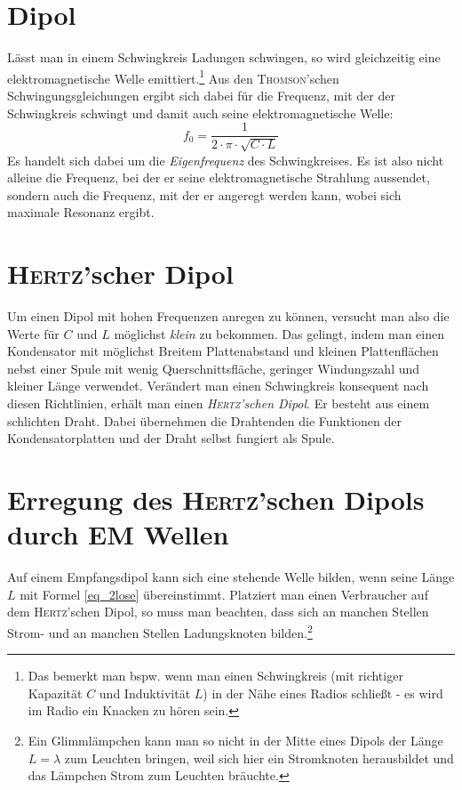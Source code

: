 		\section{Dipol}

Lässt man in einem Schwingkreis Ladungen schwingen, so wird gleichzeitig eine elektromagnetische Welle emittiert.\footnote{Das bemerkt man bspw. wenn man einen Schwingkreis (mit richtiger Kapazität \(C\) und Induktivität \(L\)) in der Nähe eines Radios schließt - es wird im Radio ein Knacken zu hören sein.} Aus den \textsc{Thomson}'schen Schwingungsgleichungen ergibt sich dabei für die Frequenz, mit der der Schwingkreis schwingt und damit auch seine elektromagnetische Welle:
\begin{equation}
 	f_0 = \frac{1}{2 \cdot \pi \cdot \sqrt{C \cdot L}}
 	\label{freq_emw}
\end{equation}
Es handelt sich dabei um die \emph{Eigenfrequenz} des Schwingkreises. Es ist also nicht alleine die Frequenz, bei der er seine elektromagnetische Strahlung aussendet, sondern auch die Frequenz, mit der er angeregt werden kann, wobei sich maximale Resonanz ergibt.




		\section{\textsc{Hertz}'scher Dipol}

Um einen Dipol mit hohen Frequenzen anregen zu können, versucht man also die Werte für \(C\) und \(L\) möglichst \emph{klein} zu bekommen. Das gelingt, indem man einen Kondensator mit möglichst Breitem Plattenabstand und kleinen Plattenflächen nebst einer Spule mit wenig Querschnittsfläche, geringer Windungszahl und kleiner Länge verwendet. Verändert man einen Schwingkreis konsequent nach diesen Richtlinien, erhält man einen  \emph{\textsc{Hertz}'schen Dipol}. Er besteht aus einem schlichten Draht. Dabei übernehmen die Drahtenden die Funktionen der Kondensatorplatten und der Draht selbst fungiert als Spule.






		\section{Erregung des \textsc{Hertz}'schen Dipols durch EM Wellen}

Auf einem Empfangsdipol kann sich eine stehende Welle bilden, wenn seine Länge \(L\) mit Formel \ref{eq_2lose} über\-ein\-stimmt. Platziert man einen Verbraucher auf dem \textsc{Hertz}'schen Dipol, so muss man beachten, dass sich an manchen Stellen Strom- und an manchen Stellen Ladungsknoten bilden.\footnote{Ein Glimmlämpchen kann man so nicht in der Mitte eines Dipols der Länge \(L = \lambda\) zum Leuchten bringen, weil sich hier ein Stromknoten herausbildet und das Lämpchen Strom zum Leuchten bräuchte.}

